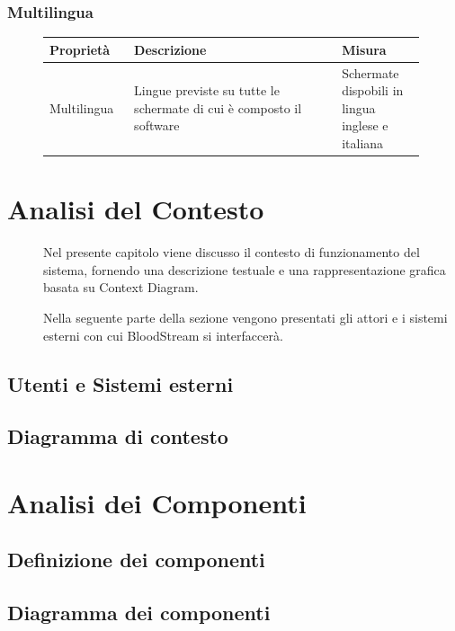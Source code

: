 \documentclass{article}
\begin{document}
\subsubsection{Multilingua}\label{rnf_8}
\begin{description}
	\item[]
	    
	\begin{table}[!htbp]
		\begin{tabular} {|>{\raggedright\arraybackslash}m{0.20\linewidth} | >{\raggedright\arraybackslash}m{0.50\linewidth}|>{\raggedright\arraybackslash}m{0.20\linewidth}|}
			\hline
			\textbf{Proprietà} & \textbf{Descrizione}                                                 & \textbf{Misura}                                  \\ \hline
			Multilingua         & Lingue previste su tutte le schermate di cui è composto il software & Schermate dispobili in lingua inglese e italiana \\ \hline
		\end{tabular}
	\end{table}
	    
\end{description}

\clearpage

\section{Analisi del Contesto}
\begin{description}
	\item[] Nel presente capitolo viene discusso il contesto di funzionamento del sistema, fornendo una descrizione testuale e una rappresentazione grafica basata su Context Diagram.
	
	Nella seguente parte della sezione vengono presentati gli attori e i sistemi esterni con cui BloodStream si interfaccerà. 
\end{description}

\subsection{Utenti e Sistemi esterni}
\subsection{Diagramma di contesto}
\clearpage

\section{Analisi dei Componenti}
\subsection{Definizione dei componenti}

\subsection{Diagramma dei componenti}
\end{document}
